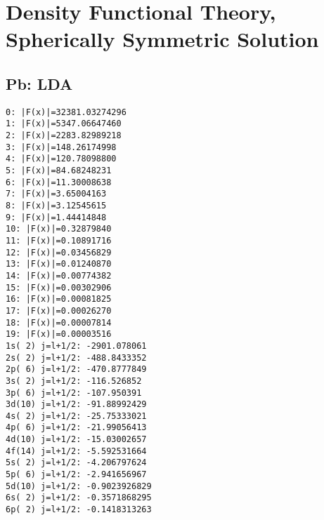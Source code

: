 











\section{Density Functional Theory, Spherically Symmetric Solution}

\subsection{Pb: LDA}

\begin{lstlisting}
0: |F(x)|=32381.03274296
1: |F(x)|=5347.06647460
2: |F(x)|=2283.82989218
3: |F(x)|=148.26174998
4: |F(x)|=120.78098800
5: |F(x)|=84.68248231
6: |F(x)|=11.30008638
7: |F(x)|=3.65004163
8: |F(x)|=3.12545615
9: |F(x)|=1.44414848
10: |F(x)|=0.32879840
11: |F(x)|=0.10891716
12: |F(x)|=0.03456829
13: |F(x)|=0.01240870
14: |F(x)|=0.00774382
15: |F(x)|=0.00302906
16: |F(x)|=0.00081825
17: |F(x)|=0.00026270
18: |F(x)|=0.00007814
19: |F(x)|=0.00003516
1s( 2) j=l+1/2: -2901.078061
2s( 2) j=l+1/2: -488.8433352
2p( 6) j=l+1/2: -470.8777849
3s( 2) j=l+1/2: -116.526852
3p( 6) j=l+1/2: -107.950391
3d(10) j=l+1/2: -91.88992429
4s( 2) j=l+1/2: -25.75333021
4p( 6) j=l+1/2: -21.99056413
4d(10) j=l+1/2: -15.03002657
4f(14) j=l+1/2: -5.592531664
5s( 2) j=l+1/2: -4.206797624
5p( 6) j=l+1/2: -2.941656967
5d(10) j=l+1/2: -0.9023926829
6s( 2) j=l+1/2: -0.3571868295
6p( 2) j=l+1/2: -0.1418313263
\end{lstlisting}

